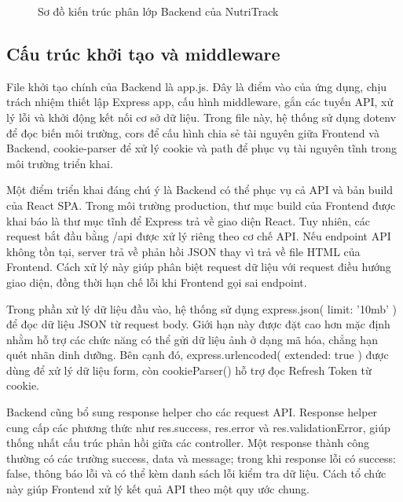 \documentclass[12pt, a4paper]{report}
\begin{document}
\begin{figure}[htbp]
{
    }%
    \caption{Sơ đồ kiến trúc phân lớp Backend của NutriTrack}
    \label{fig:backend_architecture}
\end{figure}

\subsection{Cấu trúc khởi tạo và middleware}File khởi tạo chính của Backend là app.js. Đây là điểm vào của ứng dụng, chịu trách nhiệm thiết lập Express app, cấu hình middleware, gắn các tuyến API, xử lý lỗi và khởi động kết nối cơ sở dữ liệu. Trong file này, hệ thống sử dụng dotenv để đọc biến môi trường, cors để cấu hình chia sẻ tài nguyên giữa Frontend và Backend, cookie-parser để xử lý cookie và path để phục vụ tài nguyên tĩnh trong môi trường triển khai.

Một điểm triển khai đáng chú ý là Backend có thể phục vụ cả API và bản build của React SPA. Trong môi trường production, thư mục build của Frontend được khai báo là thư mục tĩnh để Express trả về giao diện React. Tuy nhiên, các request bắt đầu bằng /api được xử lý riêng theo cơ chế API. Nếu endpoint API không tồn tại, server trả về phản hồi JSON thay vì trả về file HTML của Frontend. Cách xử lý này giúp phân biệt request dữ liệu với request điều hướng giao diện, đồng thời hạn chế lỗi khi Frontend gọi sai endpoint.

Trong phần xử lý dữ liệu đầu vào, hệ thống sử dụng express.json({ limit: '10mb' }) để đọc dữ liệu JSON từ request body. Giới hạn này được đặt cao hơn mặc định nhằm hỗ trợ các chức năng có thể gửi dữ liệu ảnh ở dạng mã hóa, chẳng hạn quét nhãn dinh dưỡng. Bên cạnh đó, express.urlencoded({ extended: true }) được dùng để xử lý dữ liệu form, còn cookieParser() hỗ trợ đọc Refresh Token từ cookie.

Backend cũng bổ sung response helper cho các request API. Response helper cung cấp các phương thức như res.success, res.error và res.validationError, giúp thống nhất cấu trúc phản hồi giữa các controller. Một response thành công thường có các trường success, data và message; trong khi response lỗi có success: false, thông báo lỗi và có thể kèm danh sách lỗi kiểm tra dữ liệu. Cách tổ chức này giúp Frontend xử lý kết quả API theo một quy ước chung.
\end{document}
